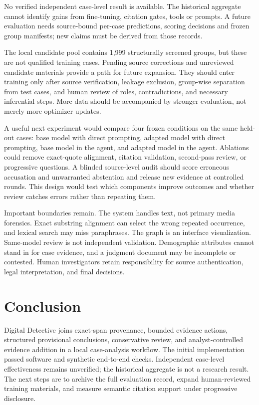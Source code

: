 \documentclass[10pt,a4paper]{article}
\begin{document}
No verified independent case-level result is available. The historical aggregate cannot identify gains from fine-tuning, citation gates, tools or prompts. A future evaluation needs source-bound per-case predictions, scoring decisions and frozen group manifests; new claims must be derived from those records.

The local candidate pool contains 1,999 structurally screened groups, but these are not qualified training cases. Pending source corrections and unreviewed candidate materials provide a path for future expansion. They should enter training only after source verification, leakage exclusion, group-wise separation from test cases, and human review of roles, contradictions, and necessary inferential steps. More data should be accompanied by stronger evaluation, not merely more optimizer updates.

A useful next experiment would compare four frozen conditions on the same held-out cases: base model with direct prompting, adapted model with direct prompting, base model in the agent, and adapted model in the agent. Ablations could remove exact-quote alignment, citation validation, second-pass review, or progressive questions. A blinded source-level audit should score erroneous accusation and unwarranted abstention and release new evidence at controlled rounds. This design would test which components improve outcomes and whether review catches errors rather than repeating them.

Important boundaries remain. The system handles text, not primary media forensics. Exact substring alignment can select the wrong repeated occurrence, and lexical search may miss paraphrases. The graph is an interface visualization. Same-model review is not independent validation. Demographic attributes cannot stand in for case evidence, and a judgment document may be incomplete or contested. Human investigators retain responsibility for source authentication, legal interpretation, and final decisions.

\section{Conclusion}
Digital Detective joins exact-span provenance, bounded evidence actions, structured provisional conclusions, conservative review, and analyst-controlled evidence addition in a local case-analysis workflow. The initial implementation passed software and synthetic end-to-end checks. Independent case-level effectiveness remains unverified; the historical aggregate is not a research result. The next steps are to archive the full evaluation record, expand human-reviewed training materials, and measure semantic citation support under progressive disclosure.
\end{document}
